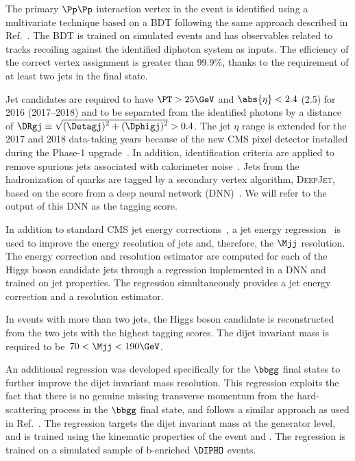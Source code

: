 \documentclass[11pt,a4paper,cmspaper,final,collab]{cms-tdr}
\begin{document}
The primary $\Pp\Pp$ interaction vertex in the event is identified using a multivariate technique based on a BDT following the same approach described in Ref.~\cite{Khachatryan:2014ira}. The BDT is trained on simulated \ggH events and has observables related to tracks recoiling against the identified diphoton system as inputs. The efficiency of the correct vertex assignment is greater than 99.9\%, thanks to the requirement of at least two jets in the \bbgg final state.

Jet candidates are required to have $\PT > 25 \GeV$ and $\abs{\eta} < 2.4$ (2.5) for 2016 (2017--2018) and to be separated from the identified photons by a distance of $\DRgj \equiv \sqrt{\smash[b]{(\Detagj)^2 +(\Dphigj)^2}}  > 0.4$. The jet $\eta$ range is extended for the 2017 and 2018 data-taking years because of the new CMS pixel detector installed during the Phase-1 upgrade~\cite{Vormwald_2019}. In addition, identification criteria
are applied to remove spurious jets associated with calorimeter noise~\cite{PUJID}. Jets from the hadronization of {\cPqb} quarks are tagged by a secondary vertex algorithm, \textsc{DeepJet}, 
based on the score from a deep neural network (DNN)~\cite{CMS-DP-2018-058,Bols:2020bkb}. We will refer to the
output of this DNN as the {\cPqb} tagging score.

In addition to standard CMS jet energy corrections~\cite{JINST6}, a {\cPqb} jet energy regression~\cite{Sirunyan:2019wwa} is used to improve the energy resolution of {\cPqb} jets and, therefore, the $\Mjj$ resolution. The energy correction and resolution estimator are computed for each of the Higgs boson candidate jets through a regression implemented in a DNN and trained on jet properties. The regression simultaneously provides a {\cPqb} jet energy correction and a resolution estimator.

In events with more than two jets, the Higgs boson candidate is reconstructed from the two jets with the highest {\cPqb} tagging scores. The dijet invariant mass is required to be~\mbox{$70 < \Mjj < 190\GeV$}.

An additional regression was developed specifically for the $\bbgg$ final states to further improve the dijet invariant mass resolution. This regression exploits the fact that there is no genuine missing transverse momentum from the hard-scattering process in the $\bbgg$ final state, and follows a similar approach as used in Ref.~\cite{Sirunyan:2018iwt}. The regression targets the dijet invariant mass at the generator level, and is trained using the kinematic properties of the event and \ptmiss. The regression is trained on a simulated sample of b-enriched $\DIPHO$ events.
\end{document}
